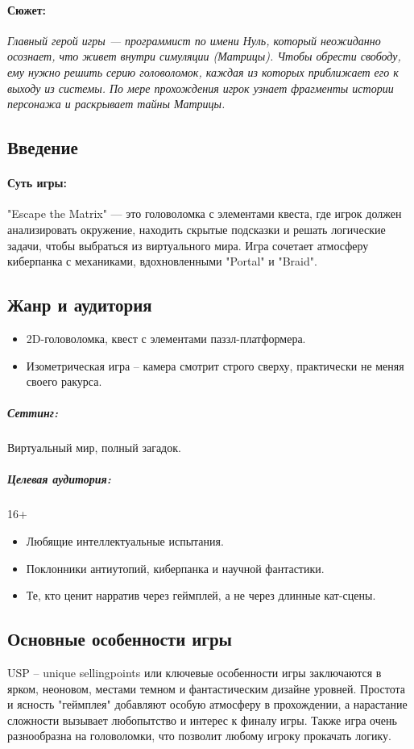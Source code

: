 \documentclass{article}
\begin{document}
\paragraph{\textbf{Сюжет:}}
\textit{Главный герой игры — программист по имени Нуль, который неожиданно осознает, что живет внутри симуляции (Матрицы). Чтобы обрести свободу, ему нужно решить серию головоломок, каждая из которых приближает его к выходу из системы. По мере прохождения игрок узнает фрагменты истории персонажа и раскрывает тайны Матрицы.
}

\subsection{Введение}

\paragraph{\textbf{Суть игры:}}
"Escape the Matrix" — это головоломка с элементами квеста, где игрок должен анализировать окружение, находить скрытые подсказки и решать логические задачи, чтобы выбраться из виртуального мира. Игра сочетает атмосферу киберпанка с механиками, вдохновленными "Portal" и "Braid".

\subsection{Жанр и аудитория}
\begin{itemize}
\item 2D-головоломка, квест с элементами паззл-платформера.
\item Изометрическая игра – камера смотрит строго сверху, практически не меняя своего ракурса.
\end{itemize}

\subparagraph{Сеттинг:} Виртуальный мир, полный загадок.
\subparagraph{Целевая аудитория:} 16+ 
\begin{itemize}
\item Любящие интеллектуальные испытания.
\item Поклонники антиутопий, киберпанка и научной фантастики.
\item Те, кто ценит нарратив через геймплей, а не через длинные кат-сцены.
\end{itemize}
\subsection{Основные особенности игры}
USP – unique sellingpoints или ключевые особенности игры заключаются в ярком, неоновом, местами темном и фантастическим дизайне уровней. Простота и ясность "геймплея" добавляют особую атмосферу в прохождении, а нарастание сложности вызывает любопытство и интерес к финалу игры.
Также игра очень разнообразна на головоломки, что позволит любому игроку прокачать логику. 
\end{document}
